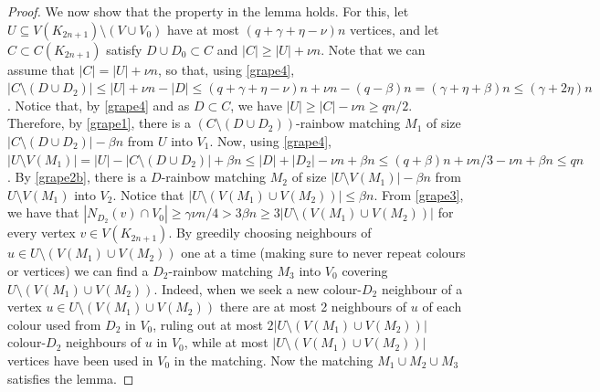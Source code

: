 \begin{proof}
We now show that the property in the lemma holds. For this, let $U\subseteq V(K_{2n+1})\setminus (V\cup V_0)$ have at most $(q+\gamma+\eta-\nu)n$ vertices, and let $C\subset C(K_{2n+1})$ satisfy   $D\cup D_0\subset C$ and $|C|\geq |U|+\nu n$.
Note that we can assume that $|C|=|U|+\nu n$, so that, using \ref{grape4}, $|C\setminus (D \cup D_2)|\leq |U|+\nu n -|D| \leq (q+\gamma+\eta-\nu)n+\nu n-(q-\beta)n= (\gamma+\eta +\beta)n\leq (\gamma+2\eta)n$. Notice that, by \ref{grape4} and as $D\subset C$, we have $|U|\geq |C|-\nu n\geq q n/2$.
Therefore, by \ref{grape1}, there is a $(C\setminus (D \cup D_2))$-rainbow matching $M_1$ of size $|C\setminus (D \cup D_2)|-\beta n$ from $U$ into $V_1$. Now, using \ref{grape4}, $|U\setminus V(M_1)|=|U|-|C\setminus (D \cup D_2)|+\beta n\leq |D|+|D_2|-\nu n+\beta n\leq (q+\beta)n+\nu n/3-\nu n+\beta n\leq q n$. By \ref{grape2b}, there is a $D$-rainbow matching $M_2$ of size $|U\setminus V(M_1)| -\beta n$ from $U\setminus V(M_1)$ into $V_2$.
Notice that  $|U\setminus (V(M_1)\cup V(M_2))|\leq \beta n$.
From \ref{grape3}, we have that $|N_{D_2}(v)\cap V_0|\geq \gamma \nu n/4> 3 \beta n \geq 3|U\setminus (V(M_1)\cup V(M_2))|$ for every vertex $v\in V(K_{2n+1})$. By greedily choosing neighbours of $u\in U\setminus (V(M_1)\cup V(M_2))$ one at a time (making sure to never repeat colours or vertices) we can find a $D_2$-rainbow matching $M_3$ into $V_0$ covering $U\setminus (V(M_1)\cup V(M_2))$. Indeed, when we seek a new colour-$D_2$ neighbour of a vertex $u\in U\setminus (V(M_1)\cup V(M_2))$ there are at most 2 neighbours of $u$ of each colour used from $D_2$ in $V_0$, ruling out at most $2|U\setminus (V(M_1)\cup V(M_2))|$ colour-$D_2$ neighbours of $u$ in $V_0$, while at most $|U\setminus (V(M_1)\cup V(M_2))|$ vertices have been used in $V_0$ in the matching.
Now the matching $M_1\cup M_2\cup M_3$ satisfies the lemma.
\end{proof}

